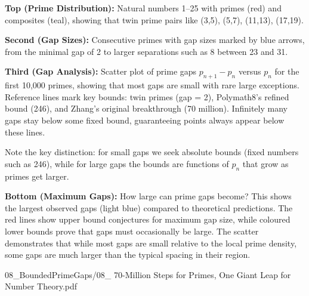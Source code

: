 \begin{SideNotePage}{
  \textbf{Top (Prime Distribution):} Natural numbers 1–25 with primes (red) and composites (teal), showing that twin prime pairs like (3,5), (5,7), (11,13), (17,19). \par
  \textbf{Second (Gap Sizes):} Consecutive primes with gap sizes marked by blue arrows, from the minimal gap of 2 to larger separations such as 8 between 23 and 31. \par
  \textbf{Third (Gap Analysis):} Scatter plot of prime gaps $p_{n+1} - p_n$ versus $p_n$ for the first 10,000 primes, showing that most gaps are small with rare large exceptions. Reference lines mark key bounds: twin primes (gap = 2), Polymath8's refined bound (246), and Zhang's original breakthrough (70 million). Infinitely many gaps stay below some fixed bound, guaranteeing points always appear below these lines.

  Note the key distinction: for small gaps we seek absolute bounds (fixed numbers such as 246), while for large gaps the bounds are functions of $p_n$ that grow as primes get larger. \par

  \textbf{Bottom (Maximum Gaps):} How large can prime gaps become? This shows the largest observed gaps (light blue) compared to theoretical predictions. The red lines show upper bound conjectures for maximum gap size, while coloured lower bounds prove that gaps must occasionally be large. The scatter demonstrates that while most gaps are small relative to the local prime density, some gaps are much larger than the typical spacing in their region. \par
}{08_BoundedPrimeGaps/08_ 70-Million Steps for Primes, One Giant Leap for Number Theory.pdf}
\end{SideNotePage}
